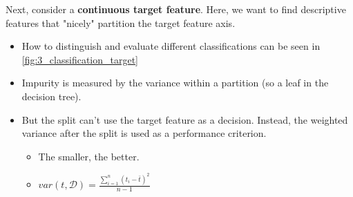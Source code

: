 Next, consider a \textbf{continuous target feature}. Here, we want to find descriptive features that "nicely" partition the target feature axis. 
\begin{itemize}
  \item How to distinguish and evaluate different classifications can be seen in \ref{fig:3_classification_target}
  \item Impurity is measured by the variance within a partition (so a leaf in the decision tree). 
  \item But the split can't use the target feature as a decision. Instead, the weighted variance after the split is used as a performance criterion.
  \begin{itemize}
    \item The smaller, the better.
    \item $var(t, \mathcal{D}) = \frac{\sum_{i=1}^{n}(t_i-\bar{t})^2}{n-1}$
  \end{itemize}
\end{itemize}

